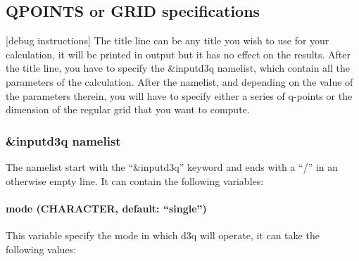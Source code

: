 \documentclass[
]{article}
\begin{document}
\hypertarget{qpoints-or-grid-specifications}{%
\subsection{QPOINTS or GRID
specifications}\label{qpoints-or-grid-specifications}}

{[}debug instructions{]} The title line can be any title you wish to use
for your calculation, it will be printed in output but it has no effect
on the results. After the title line, you have to specify the \&inputd3q
namelist, which contain all the parameters of the calculation. After the
namelist, and depending on the value of the parameters therein, you will
have to specify either a series of q-points or the dimension of the
regular grid that you want to compute.

\hypertarget{inputd3q-namelist}{%
\subsubsection{\&inputd3q namelist}\label{inputd3q-namelist}}

The namelist start with the \enquote{\&inputd3q} keyword and ends with a
\enquote{/} in an otherwise empty line. It can contain the following
variables:

\hypertarget{mode-character-default-single}{%
\paragraph{\texorpdfstring{mode (CHARACTER, default:
\enquote{single})}{mode (CHARACTER, default: ``single'')}}\label{mode-character-default-single}}

This variable specify the mode in which d3q will operate, it can take
the following values:
\end{document}
